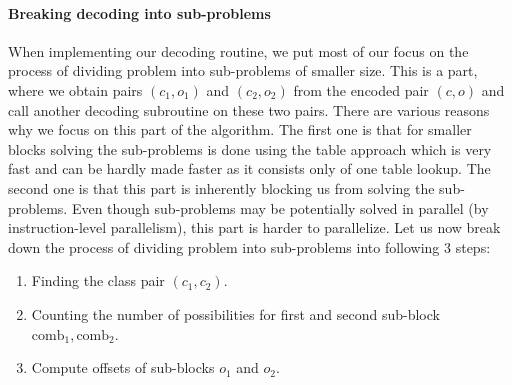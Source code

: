 \paragraph{Breaking decoding into sub-problems}

When implementing our decoding routine, we put most of our focus on the process of dividing problem into
sub-problems of smaller size. This is a part, where we obtain pairs $(c_1, o_1)$ and $(c_2, o_2)$
from the encoded pair $(c, o)$ and call another decoding subroutine on these two pairs.
There are various reasons why we focus on this part of the algorithm. The first one is that for smaller
blocks solving the sub-problems is done using the table approach which is very fast and can be hardly
made faster as it consists only of one table lookup. The second one is that this part is
inherently blocking us from solving the sub-problems. Even though sub-problems may be potentially
solved in parallel (by instruction-level parallelism), this part is harder to parallelize. Let us
now break down the process of dividing problem into sub-problems into following 3 steps:
\begin{enumerate}
	\item Finding the class pair $(c_1, c_2)$.
	\item Counting the number of possibilities for first and second sub-block $\text{comb}_1, \text{comb}_2$.
	\item Compute offsets of sub-blocks $o_1$ and $o_2$.
\end{enumerate}


